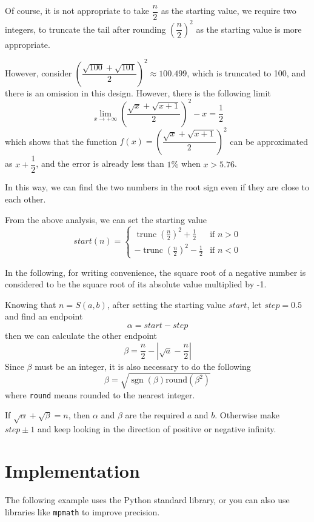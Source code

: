 \documentclass[a4paper]{article}
\DeclareMathOperator{\sgn}{\mathrm{sgn}}
\DeclareMathOperator{\trunc}{\mathrm{trunc}}
\begin{document}
Of course, it is not appropriate to take $\dfrac{n}{2}$ as the starting value, we require two integers, to truncate the tail after rounding $\left(\dfrac{n}{2}\right)^2$ as the starting value is more appropriate.

However, consider $\left(\dfrac{\sqrt{100}+\sqrt{101}}{2}\right)^2\approx100.499$, which is truncated to 100, and there is an omission in this design. However, there is the following limit \[\lim_{x\to+\infty} \left(\frac{\sqrt{x}+\sqrt{x+1}}{2}\right)^2 - x=\frac{1}{2}\] which shows that the function $f(x)=\left(\dfrac{\sqrt{x}+\sqrt{x+1}}{2}\right)^2$ can be approximated as $x+\dfrac{1}{2}$, and the error is already less than $1\%$ when $x>5.76$.

In this way, we can find the two numbers in the root sign even if they are close to each other.

From the above analysis, we can set the starting value
\[
    start(n)=
    \begin{cases}
        \trunc(\frac{n}{2})^2+\frac{1}{2}  & \text{if }n>0 \\
        -\trunc(\frac{n}{2})^2-\frac{1}{2} & \text{if }n<0
    \end{cases}
\]

In the following, for writing convenience, the square root of a negative number is considered to be the square root of its absolute value multiplied by -1.

Knowing that $n=S(a,b)$, after setting the starting value $start$, let $step=0.5$ and find an endpoint \[\alpha=start-step\] then we can calculate the other endpoint \[\beta=\frac{n}{2}-|\sqrt{a}-\frac{n}{2}|\] Since $\beta $ must be an integer, it is also necessary to do the following \[\beta=\sqrt{\sgn(\beta)\mathrm{round}(\beta^2)}\] where \verb|round| means rounded to the nearest integer.

If $\sqrt{\alpha}+\sqrt{\beta}=n$, then $\alpha$ and $\beta$ are the required $a$ and $b$. Otherwise make $step\pm1$ and keep looking in the direction of positive or negative infinity.

\section{Implementation}
The following example uses the Python standard library, or you can also use libraries like \verb|mpmath| to improve precision.
\end{document}
